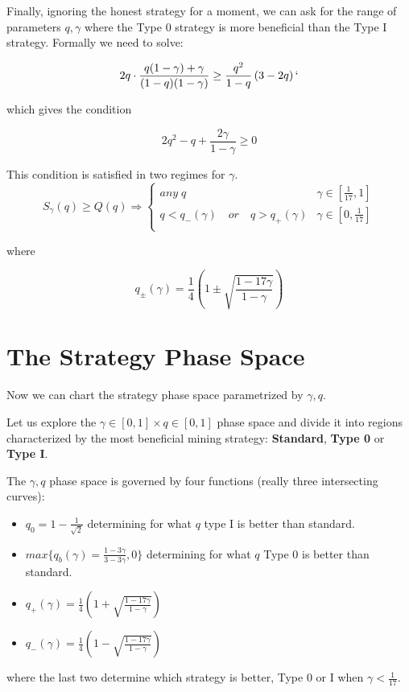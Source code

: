 \documentclass[letterpaper,12pt]{report}
\theoremstyle{plain}
\theoremstyle{definition}
\begin{document}
Finally, ignoring the honest strategy for a moment, we can ask for the range of parameters $q,\gamma$ where the Type 0 strategy is more beneficial than the Type I strategy. Formally we need to solve:

\begin{equation}\label{eqn:type0overtype1}
2q\cdot\frac{q(1-\gamma)+\gamma}{(1-q)(1-\gamma)}\geq \dfrac{q^2}{1-q}\left(
3-2q
\right)`
\end{equation}

which gives the condition

\begin{equation}\label{eqn:type0over1condition}
2q^2-q+\frac{2\gamma}{1-\gamma}\geq 0
\end{equation}

This condition is satisfied in two regimes for $\gamma$.
\begin{equation}\label{eqn:type0over1gammaregimes}
S_{\gamma}(q)\geq Q(q) \Longrightarrow
\begin{cases}
\mathit{any\;} q & \gamma\in [\frac{1}{17},1] \\ 
q<q_-(\gamma)\quad \mathit{or}\quad q>q_+(\gamma) & \gamma\in [0,\frac{1}{17}] \\ 
\end{cases}
\end{equation}

where 

\begin{equation}\label{qplusminus}
q_{\pm}(\gamma)=\frac{1}{4}\left(1\pm\sqrt{\frac{1-17\gamma}{1-\gamma}}\right)
\end{equation}


\section{The Strategy Phase Space}\label{sec:phasespace}

Now we can chart the strategy phase space parametrized by $\gamma,q$. 

Let us explore the $\gamma\in[0,1] \times q\in [0,1]$ phase space and divide it into regions characterized by the most beneficial mining strategy: \textbf{Standard}, \textbf{Type 0} or \textbf{Type I}.

The $\gamma, q$ phase space is governed by four functions (really three intersecting curves):
\begin{itemize}
\item $q_0= 1-\frac{1}{\sqrt{2}}$ determining for what $q$ type I is better than standard.
\item $max\lbrace q_b(\gamma)=\frac{1-3\gamma}{3-3\gamma},0\rbrace$ determining for what $q$ Type 0 is better than standard.
\item $q_+(\gamma)=\frac{1}{4}\left(1+\sqrt{\frac{1-17\gamma}{1-\gamma}}\right)$ 
\item $q_-(\gamma)=\frac{1}{4}\left(1-\sqrt{\frac{1-17\gamma}{1-\gamma}}\right)$
\end{itemize}
where the last two determine which strategy is better, Type 0 or I when $\gamma<\frac{1}{17}$.
\end{document}
